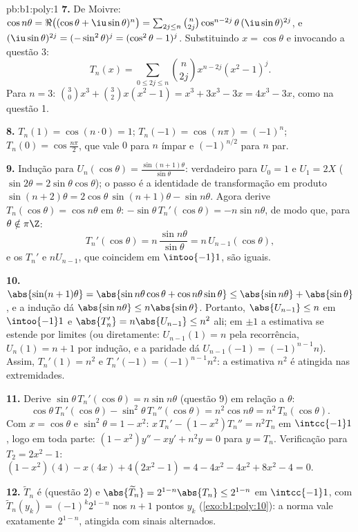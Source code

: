 \begin{solution}{pb:b1:poly:1}
\textbf{7.} De Moivre: $\cos n\theta = \Re\bigl((\cos\theta +
\iu\sin\theta)^n\bigr) = \sum_{2j \leq n}\binom n{2j}
\cos^{n-2j}\theta\,(\iu\sin\theta)^{2j}$, e $(\iu\sin\theta)^{2j}
= (-\sin^2\theta)^j = (\cos^2\theta - 1)^j$. Substituindo $x =
\cos\theta$ e invocando a questão 3:
\[
T_n(x) = \sum_{0\leq 2j\leq n}\binom n{2j}x^{n-2j}(x^2 - 1)^j .
\]
Para $n = 3$: $\binom30 x^3 + \binom32 x(x^2 - 1) = x^3 + 3x^3 -
3x = 4x^3 - 3x$, como na questão 1.

\textbf{8.} $T_n(1) = \cos(n\cdot0) = 1$; $T_n(-1) = \cos(n\pi) =
(-1)^n$; $T_n(0) = \cos\frac{n\pi}2$, que vale $0$ para $n$ ímpar e
$(-1)^{n/2}$ para $n$ par.

\textbf{9.} Indução para $U_n(\cos\theta) =
\frac{\sin(n+1)\theta}{\sin\theta}$: verdadeiro para $U_0 = 1$ e $U_1 =
2X$
($\sin2\theta = 2\sin\theta\cos\theta$); o passo é a
identidade de transformação em produto $\sin(n+2)\theta = 2\cos\theta\,
\sin(n+1)\theta - \sin n\theta$. Agora derive
$T_n(\cos\theta) = \cos n\theta$ em $\theta$:
$-\sin\theta\,T_n'(\cos\theta) = -n\sin n\theta$, de modo que, para $\theta
\notin \pi\Z$:
\[
T_n'(\cos\theta) = n\,\frac{\sin n\theta}{\sin\theta}
= n\,U_{n-1}(\cos\theta) ,
\]
e os  $T_n'$ e $nU_{n-1}$, que coincidem em
$\intoo{-1}1$, são iguais.

\textbf{10.} $\abs{\sin(n+1)\theta} = \abs{\sin n\theta\cos\theta
+ \cos n\theta\sin\theta} \leq \abs{\sin n\theta} +
\abs{\sin\theta}$, e a indução dá $\abs{\sin n\theta} \leq
n\abs{\sin\theta}$. Portanto, $\abs{U_{n-1}} \leq n$ em $\intoo{-1}1$
e $\abs{T_n'} = n\abs{U_{n-1}} \leq n^2$ ali; em $\pm1$ a
estimativa se estende por limites (ou diretamente: $U_{n-1}(1) = n$ pela
recorrência, $U_n(1) = n + 1$ por indução, e a paridade dá
$U_{n-1}(-1) = (-1)^{n-1}n$). Assim, $T_n'(1) = n^2$ e $T_n'(-1)
= (-1)^{n-1}n^2$: a estimativa $n^2$ é atingida nas extremidades.

\textbf{11.} Derive $\sin\theta\,T_n'(\cos\theta) = n\sin
n\theta$ (questão 9) em relação a $\theta$:
\[
\cos\theta\,T_n'(\cos\theta) - \sin^2\theta\,T_n''(\cos\theta)
= n^2\cos n\theta = n^2\,T_n(\cos\theta) .
\]
Com $x = \cos\theta$ e $\sin^2\theta = 1 - x^2$: $x\,T_n' - (1
- x^2)T_n'' = n^2T_n$ em $\intcc{-1}1$, logo em toda parte:
$(1 - x^2)y'' - xy' + n^2y = 0$ para $y = T_n$. Verificação para $T_2 =
2x^2 - 1$: $(1 - x^2)(4) - x(4x) + 4(2x^2 - 1) = 4 - 4x^2 - 4x^2
+ 8x^2 - 4 = 0$.

\textbf{12.} $\widetilde T_n$ é  (questão 2) e
$\abs{\widetilde T_n} = 2^{1-n}\abs{T_n} \leq 2^{1-n}$ em
$\intcc{-1}1$, com $\widetilde T_n(y_k) = (-1)^k2^{1-n}$ nos
$n + 1$ pontos $y_k$ (\cref{exo:b1:poly:10}): a norma vale exatamente
$2^{1-n}$, atingida com sinais alternados.


\end{solution}
